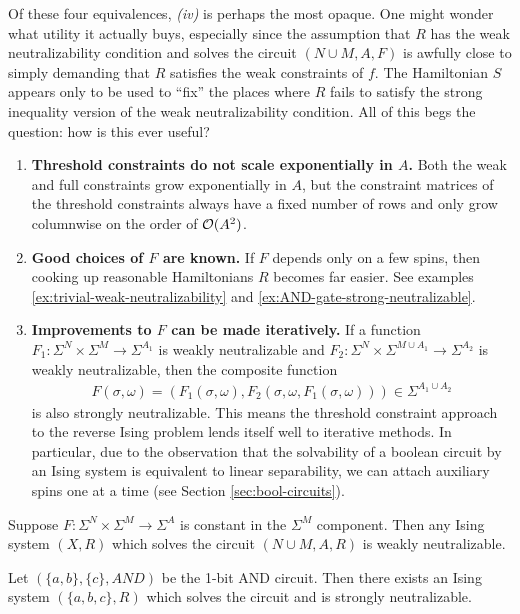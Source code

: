 \documentclass{article}
\begin{document}
\begin{rmk}
  Of these four equivalences, \emph{(iv)} is perhaps the most opaque. One might wonder what utility it actually buys, especially since the assumption that $R$ has the weak neutralizability condition and solves the circuit $(N\cup M, A, F)$ is awfully close to simply demanding that $R$ satisfies the weak constraints of $f$. The Hamiltonian $S$ appears only to be used to ``fix'' the places where $R$ fails to satisfy the strong inequality version of the weak neutralizability condition. All of this begs the question: how is this ever useful?

  \begin{enumerate}
    \item \textbf{Threshold constraints do not scale exponentially in $A$.} Both the weak and full constraints grow exponentially in $A$, but the constraint matrices of the threshold constraints always have a fixed number of rows and only grow columnwise on the order of $\mathcal{O}(A^2)$.
    \item \textbf{Good choices of $F$ are known.} If $F$ depends only on a few spins, then cooking up reasonable Hamiltonians $R$ becomes far easier. See examples \ref{ex:trivial-weak-neutralizability} and \ref{ex:AND-gate-strong-neutralizable}.
    \item \textbf{Improvements to $F$ can be made iteratively.} If a function $F_1:\Sigma^N \times \Sigma^M \to \Sigma^{A_1}$ is weakly neutralizable and $F_2:\Sigma^N\times \Sigma^{M\cup A_1} \to \Sigma^{A_2}$ is weakly neutralizable, then the composite function
      \begin{align*}
        F(\sigma, \omega) = (F_1(\sigma, \omega), F_2(\sigma, \omega, F_1(\sigma, \omega))) \in \Sigma^{A_1 \cup A_2}
      \end{align*}
      is also strongly neutralizable. This means the threshold constraint approach to the reverse Ising problem lends itself well to iterative methods. In particular, due to the observation that the solvability of a boolean circuit by an Ising system is equivalent to linear separability, we can attach auxiliary spins one at a time (see Section \ref{sec:bool-circuits}).
  \end{enumerate}
\end{rmk}

\begin{example}\label{ex:trivial-weak-neutralizability}
  Suppose $F:\Sigma^N \times \Sigma^M \to \Sigma^A$ is constant in the $\Sigma^M$ component. Then any Ising system $(X, R)$ which solves the circuit $(N\cup M, A, R)$ is weakly neutralizable.
\end{example}
\begin{example}\label{ex:AND-gate-strong-neutralizable}
  Let $(\{a,b\}, \{c\}, AND)$ be the 1-bit AND circuit. Then there exists an Ising system $(\{a,b,c\}, R)$ which solves the circuit and is strongly neutralizable.
\end{example}
\end{document}

